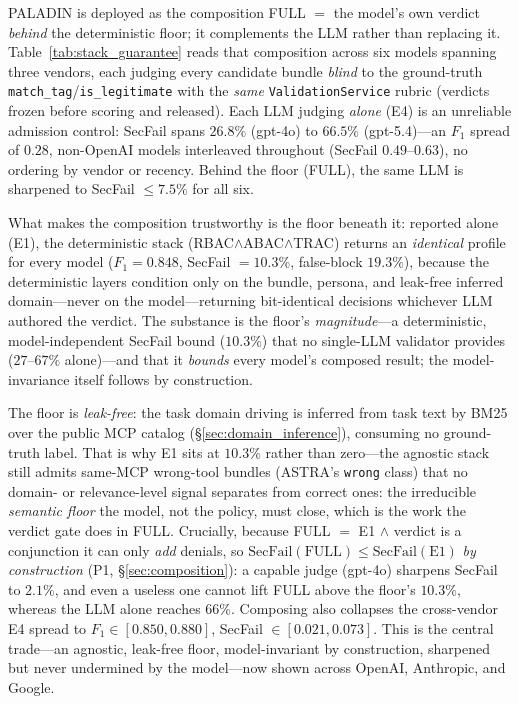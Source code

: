\documentclass[sigconf,review,anonymous]{acmart}
\begin{document}
PALADIN is deployed as the composition FULL $=$ the model's own verdict \emph{behind} the deterministic floor; it complements the LLM rather than replacing it. Table~\ref{tab:stack_guarantee} reads that composition across six models spanning three vendors, each judging every candidate bundle \emph{blind} to the ground-truth \texttt{match\_tag}/\texttt{is\_legitimate} with the \emph{same} \texttt{ValidationService} rubric (verdicts frozen before scoring and released). Each LLM judging \emph{alone} (E4) is an unreliable admission control: SecFail spans $26.8\%$ (gpt-4o) to $66.5\%$ (gpt-5.4)---an $F_1$ spread of $0.28$, non-OpenAI models interleaved throughout (SecFail $0.49$--$0.63$), no ordering by vendor or recency. Behind the floor (FULL), the same LLM is sharpened to SecFail $\leq 7.5\%$ for all six.

What makes the composition trustworthy is the floor beneath it: reported alone (E1), the deterministic stack (RBAC$\wedge$ABAC$\wedge$TRAC) returns an \emph{identical} profile for every model ($F_1=0.848$, SecFail $=10.3\%$, false-block $19.3\%$), because the deterministic layers condition only on the bundle, persona, and leak-free inferred domain---never on the model---returning bit-identical decisions whichever LLM authored the verdict. The substance is the floor's \emph{magnitude}---a deterministic, model-independent SecFail bound ($10.3\%$) that no single-LLM validator provides ($27$--$67\%$ alone)---and that it \emph{bounds} every model's composed result; the model-invariance itself follows by construction.

The floor is \emph{leak-free}: the task domain driving  is inferred from task text by BM25 over the public MCP catalog (\S\ref{sec:domain_inference}), consuming no ground-truth label. That is why E1 sits at $10.3\%$ rather than zero---the agnostic stack still admits same-MCP wrong-tool bundles (ASTRA's \texttt{wrong} class) that no domain- or relevance-level signal separates from correct ones: the irreducible \emph{semantic floor} the model, not the policy, must close, which is the work the verdict gate does in FULL. Crucially, because FULL $=$ E1 $\wedge$ verdict is a conjunction it can only \emph{add} denials, so $\mathrm{SecFail}(\text{FULL})\leq\mathrm{SecFail}(\text{E1})$ \emph{by construction} (P1, \S\ref{sec:composition}): a capable judge (gpt-4o) sharpens SecFail to $2.1\%$, and even a useless one cannot lift FULL above the floor's $10.3\%$, whereas the LLM alone reaches $66\%$. Composing also collapses the cross-vendor E4 spread to $F_1\in[0.850,0.880]$, SecFail $\in[0.021,0.073]$. This is the central trade---an agnostic, leak-free floor, model-invariant by construction, sharpened but never undermined by the model---now shown across OpenAI, Anthropic, and Google.
\end{document}

